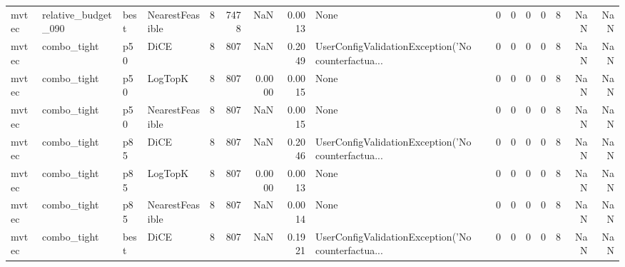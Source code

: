\begin{tabular}{llllrrrrlrrrrrrr}
  mvtec &  relative\_budget\_090 &   best & NearestFeasible &            8 &                 7478 &                      NaN &      0.0013 &                                               None &      0 &            0 &        0 &              0 &          8 &                NaN &            NaN \\
  mvtec &          combo\_tight &    p50 &            DiCE &            8 &                  807 &                      NaN &      0.2049 & UserConfigValidationException('No counterfactua... &      0 &            0 &        0 &              0 &          8 &                NaN &            NaN \\
  mvtec &          combo\_tight &    p50 &         LogTopK &            8 &                  807 &                   0.0000 &      0.0015 &                                               None &      0 &            0 &        0 &              0 &          8 &                NaN &            NaN \\
  mvtec &          combo\_tight &    p50 & NearestFeasible &            8 &                  807 &                      NaN &      0.0015 &                                               None &      0 &            0 &        0 &              0 &          8 &                NaN &            NaN \\
  mvtec &          combo\_tight &    p85 &            DiCE &            8 &                  807 &                      NaN &      0.2046 & UserConfigValidationException('No counterfactua... &      0 &            0 &        0 &              0 &          8 &                NaN &            NaN \\
  mvtec &          combo\_tight &    p85 &         LogTopK &            8 &                  807 &                   0.0000 &      0.0013 &                                               None &      0 &            0 &        0 &              0 &          8 &                NaN &            NaN \\
  mvtec &          combo\_tight &    p85 & NearestFeasible &            8 &                  807 &                      NaN &      0.0014 &                                               None &      0 &            0 &        0 &              0 &          8 &                NaN &            NaN \\
  mvtec &          combo\_tight &   best &            DiCE &            8 &                  807 &                      NaN &      0.1921 & UserConfigValidationException('No counterfactua... &      0 &            0 &        0 &              0 &          8 &                NaN &            NaN \\

\end{tabular}
